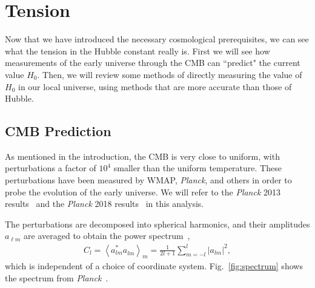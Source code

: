 \documentclass[12pt]{article}
\renewcommand{\l}{\ell}
\newcommand{\ex}[1]{\left\langle#1\right\rangle}
\renewcommand{\th}[1]{\frac{1}{#1}}
\newcommand{\Planck}[1]{\textit{Planck}}
\begin{document}
\section{Tension} \label{sec:tension}

Now that we have introduced the necessary cosmological prerequisites, we can see what the tension in the Hubble constant really is. First we will see how measurements of the early universe through the CMB can ``predict" the current value $H_0$. Then, we will review some methods of directly measuring the value of $H_0$ in our local universe, using methods that are more accurate than those of Hubble.

\subsection{CMB Prediction} \label{sub:predic}

As mentioned in the introduction, the CMB is very close to uniform, with perturbations a factor of $10^4$ smaller than the uniform temperature. These perturbations have been measured by WMAP, \Planck{}, and others in order to probe the evolution of the early universe. We will refer to the \Planck{} 2013 results~\cite{Planck2013} and the \Planck{} 2018 results~\cite{Planck2018} in this analysis.

The perturbations are decomposed into spherical harmonics, and their amplitudes $a_{\l m}$ are averaged to obtain the power spectrum~\cite{Kamionkowski1999, Samtleben2007},
\begin{align}
C_l =  \ex{a_{lm}^* a_{lm}^{\phantom{*}}}_m = \th{2l+1} \sum_{m = -l}^l |a_{lm}|^2,
\end{align}
which is independent of a choice of coordinate system. Fig.~\ref{fig:spectrum} shows the spectrum from \Planck{}~\cite{Planck2018}.
\end{document}
